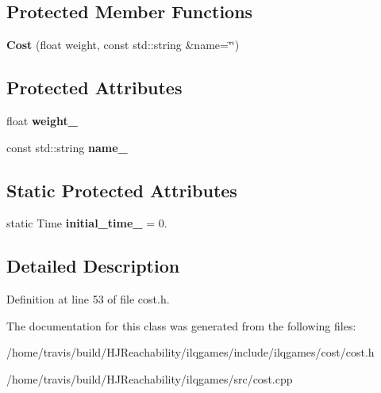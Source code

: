 \subsection*{Protected Member Functions}
\begin{DoxyCompactItemize}
\item 
{\bfseries Cost} (float weight, const std\+::string \&name=\char`\"{}\char`\"{})\hypertarget{classilqgames_1_1_cost_a9b30ac1d7733741609a3c8d6522a925b}{}\label{classilqgames_1_1_cost_a9b30ac1d7733741609a3c8d6522a925b}

\end{DoxyCompactItemize}
\subsection*{Protected Attributes}
\begin{DoxyCompactItemize}
\item 
float {\bfseries weight\+\_\+}\hypertarget{classilqgames_1_1_cost_a03c98f733c0e722960dad9e80e235652}{}\label{classilqgames_1_1_cost_a03c98f733c0e722960dad9e80e235652}

\item 
const std\+::string {\bfseries name\+\_\+}\hypertarget{classilqgames_1_1_cost_a36d7d9ee9585912fc98fca10d9c81614}{}\label{classilqgames_1_1_cost_a36d7d9ee9585912fc98fca10d9c81614}

\end{DoxyCompactItemize}
\subsection*{Static Protected Attributes}
\begin{DoxyCompactItemize}
\item 
static Time {\bfseries initial\+\_\+time\+\_\+} = 0.\hypertarget{classilqgames_1_1_cost_ab86100ec9752b36fd5b6a338964f73cc}{}\label{classilqgames_1_1_cost_ab86100ec9752b36fd5b6a338964f73cc}

\end{DoxyCompactItemize}


\subsection{Detailed Description}


Definition at line 53 of file cost.\+h.



The documentation for this class was generated from the following files\+:\begin{DoxyCompactItemize}
\item 
/home/travis/build/\+H\+J\+Reachability/ilqgames/include/ilqgames/cost/cost.\+h\item 
/home/travis/build/\+H\+J\+Reachability/ilqgames/src/cost.\+cpp\end{DoxyCompactItemize}
